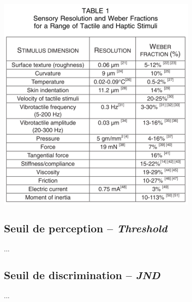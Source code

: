\includegraphics[width=10cm]{1_Bible/Photos/Biology/tab_seuil.png}

\subsection{Seuil de perception -- \textit{Threshold}}
...

\subsection{Seuil de discrimination -- \textit{JND}}
...

